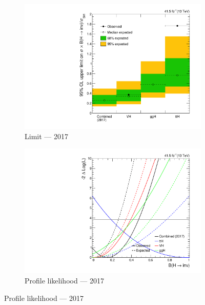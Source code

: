 \begin{figure}[htbp]
    \label{fig:htoinv_limit_likelihood_2016}
\end{figure}

\begin{figure}[htbp]
    \centering
    \begin{subfigure}[t]{0.45\textwidth}
        \includegraphics[width=\textwidth]{figures/limits/per_year/limit_2017_comb.pdf}
        \caption{Limit --- 2017}
    \end{subfigure}
    \hspace{0.05\textwidth}
    \begin{subfigure}[t]{0.45\textwidth}
        \includegraphics[width=\textwidth]{figures/likelihood_scan/profile_likelihood_scan_2017.pdf}
        \caption{Profile likelihood --- 2017}
    \end{subfigure}

\end{figure}

